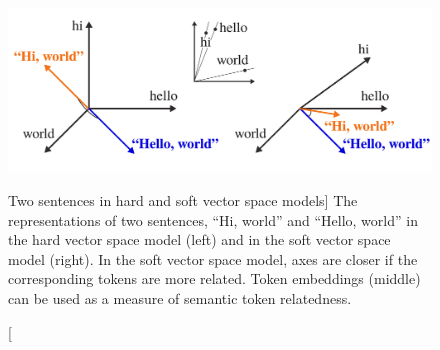 \begin{figure}
\centering
\includegraphics{soft-vsm}
\vspace{-0.4cm}
\caption
  [Two sentences in hard and soft vector space models]%
  {The representations of two sentences, ``Hi, world'' and ``Hello,
   world'' in the hard vector space model (left) and in the soft vector space
   model (right). In the soft vector space model, axes are closer if the
   corresponding tokens are more related. Token embeddings (middle) can be used
   as a measure of semantic token relatedness.
   \cite[Figure 6]{novotny2020three}}
\label{fig:soft-vsm}
\end{figure}
